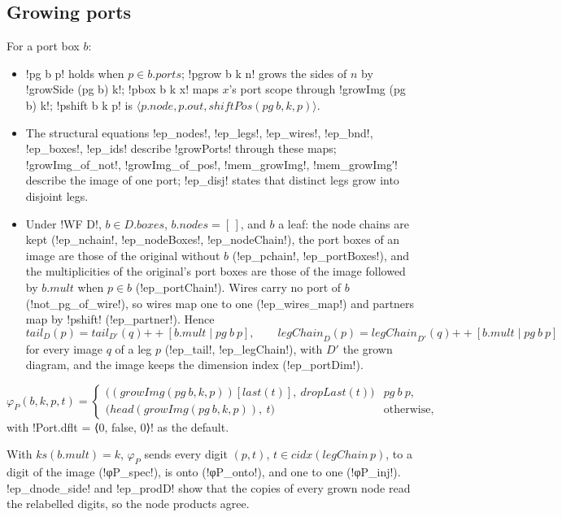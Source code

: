{\subsection{Growing ports}
For a port box $b$:
\begin{itemize}
\item \lbx!pg b p! holds when $p\in b.\mathit{ports}$; \lbx!pgrow b k n! grows the sides of $n$ by \lbx!growSide (pg b) k!; \lbx!pbox b k x! maps $x$'s port scope through \lbx!growImg (pg b) k!; \lbx!pshift b k p! is $\langle p.\mathit{node},p.\mathit{out},\mathit{shiftPos}(\mathit{pg}\ b,k,p)\rangle$.
\item The structural equations \lbx!ep_nodes!, \lbx!ep_legs!, \lbx!ep_wires!, \lbx!ep_bnd!, \lbx!ep_boxes!, \lbx!ep_ids! describe \lbx!growPorts! through these maps; \lbx!growImg_of_not!, \lbx!growImg_of_pos!, \lbx!mem_growImg!, \lbx!mem_growImg′! describe the image of one port; \lbx!ep_disj! states that distinct legs grow into disjoint legs.
\item Under \lbx!WF D!, $b\in D.\mathit{boxes}$, $b.\mathit{nodes}=[\,]$, and $b$ a leaf: the node chains are kept (\lbx!ep_nchain!, \lbx!ep_nodeBoxes!, \lbx!ep_nodeChain!), the port boxes of an image are those of the original without $b$ (\lbx!ep_pchain!, \lbx!ep_portBoxes!), and the multiplicities of the original's port boxes are those of the image followed by $b.\mathit{mult}$ when $p\in b$ (\lbx!ep_portChain!). Wires carry no port of $b$ (\lbx!not_pg_of_wire!), so wires map one to one (\lbx!ep_wires_map!) and partners map by \lbx!pshift! (\lbx!ep_partner!). Hence
\[
\mathit{tail}_D(p)=\mathit{tail}_{D'}(q)\mathbin{+\!\!+}[b.\mathit{mult}\mid \mathit{pg}\ b\ p],\qquad \mathit{legChain}_D(p)=\mathit{legChain}_{D'}(q)\mathbin{+\!\!+}[b.\mathit{mult}\mid \mathit{pg}\ b\ p]
\]
for every image $q$ of a leg $p$ (\lbx!ep_tail!, \lbx!ep_legChain!), with $D'$ the grown diagram, and the image keeps the dimension index (\lbx!ep_portDim!).
\end{itemize}

\begin{definition}\label{def:boxes-phiP}
\[
\varphi_P(b,k,p,t)=\begin{cases}\bigl((\mathit{growImg}(\mathit{pg}\ b,k,p))[\mathit{last}(t)],\ \mathit{dropLast}(t)\bigr) & \mathit{pg}\ b\ p,\\ \bigl(\mathit{head}(\mathit{growImg}(\mathit{pg}\ b,k,p)),\ t\bigr) & \text{otherwise,}\end{cases}
\]
with \lbx!Port.dflt = ⟨0, false, 0⟩! as the default.
\end{definition}
With $\mathit{ks}(b.\mathit{mult})=k$, $\varphi_P$ sends every digit $(p,t)$, $t\in\mathit{cidx}(\mathit{legChain}\,p)$, to a digit of the image (\lbx!φP_spec!), is onto (\lbx!φP_onto!), and one to one (\lbx!φP_inj!). \lbx!ep_dnode_side! and \lbx!ep_prodD! show that the copies of every grown node read the relabelled digits, so the node products agree.

}
